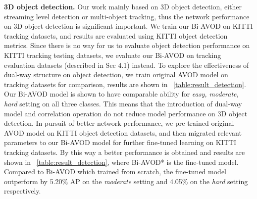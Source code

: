 \documentclass{bmvc2k}
\begin{document}
\textbf{3D object detection.} Our work mainly based on 3D object detection, either streaming level detection or multi-object tracking, thus the network performance on 3D object detection is significant important. We train our Bi-AVOD on KITTI tracking datasets, and results are evaluated using KITTI object detection metrics. Since there is no way for us to evaluate object detection performance on KITTI tracking testing datasets, we evaluate our Bi-AVOD on tracking evaluation datasets (described in Sec 4.1) instead. To explore the effectiveness of dual-way structure on object detection, we train original AVOD model on tracking datasets for comparison, results are shown in \tablename \, \ref{table:result_detection}. Our Bi-AVOD model is shown to have comparable ability for \textit{easy, moderate, hard} setting on all three classes. This means that the introduction of dual-way model and correlation operation do not reduce model performance on 3D object detection. In pursuit of better network performance, we pre-trained original AVOD model on KITTI object detection datasets, and then migrated relevant parameters to our Bi-AVOD model for further fine-tuned learning on KITTI tracking datasets. By this way a better performance is obtained and results are shown in \tablename \, \ref{table:result_detection}, where Bi-AVOD* is the fine-tuned model. Compared to Bi-AVOD which trained from scratch, the fine-tuned model outperform by 5.20\% AP on the \textit{moderate} setting and 4.05\% on the \textit{hard} setting respectively. 
\end{document}
